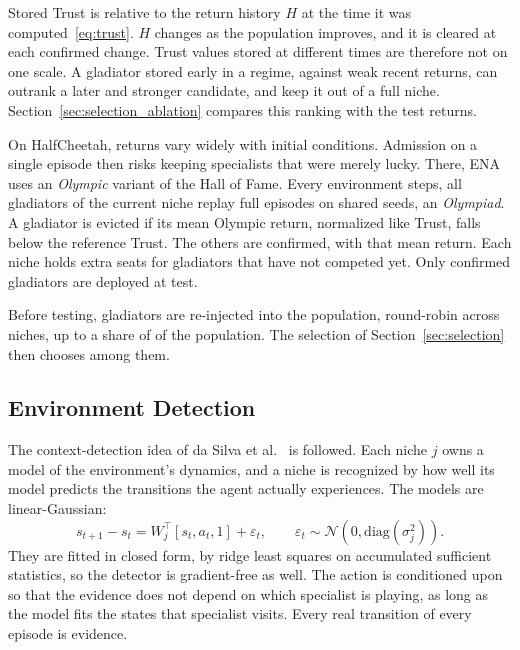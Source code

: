 Stored Trust is relative to the return history $H$ at the time it was computed~\eqref{eq:trust}. $H$ changes as the population improves, and it is cleared at each confirmed change. Trust values stored at different times are therefore not on one scale. A gladiator stored early in a regime, against weak recent returns, can outrank a later and stronger candidate, and keep it out of a full niche. Section~\ref{sec:selection_ablation} compares this ranking with the test returns.

On HalfCheetah, returns vary widely with initial conditions. Admission on a single episode then risks keeping specialists that were merely lucky. There, ENA uses an \textit{Olympic} variant of the Hall of Fame. Every  environment steps, all gladiators of the current niche replay  full episodes on shared seeds, an \textit{Olympiad}. A gladiator is evicted if its mean Olympic return, normalized like Trust, falls below the reference Trust. The others are confirmed, with that mean return. Each niche holds  extra seats for gladiators that have not competed yet. Only confirmed gladiators are deployed at test.

Before testing, gladiators are re-injected into the population, round-robin across niches, up to a share of  of the population. The selection of Section~\ref{sec:selection} then chooses among them.

\subsection{Environment Detection}
\label{sec:detection}
The context-detection idea of da Silva et al.~\citep{dasilva2006dealing} is followed. Each niche $j$ owns a model of the environment's dynamics, and a niche is recognized by how well its model predicts the transitions the agent actually experiences. The models are linear-Gaussian:
\begin{equation}
s_{t+1} - s_t = W_j^{\top}[s_t, a_t, 1] + \varepsilon_t, \qquad \varepsilon_t \sim \mathcal{N}\!\left(0, \mathrm{diag}(\sigma_j^2)\right).
\label{eq:dynamics}
\end{equation}
They are fitted in closed form, by ridge least squares on accumulated sufficient statistics, so the detector is gradient-free as well. The action is conditioned upon so that the evidence does not depend on which specialist is playing, as long as the model fits the states that specialist visits. Every real transition of every episode is evidence.

